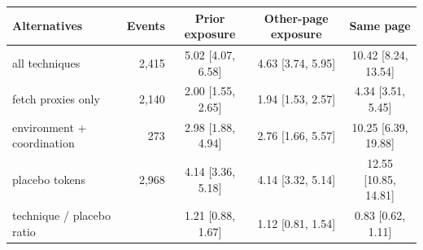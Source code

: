 \begin{tabular}{@{}lrccc@{}}
\toprule
Alternatives & Events & Prior exposure & Other-page exposure & Same page \\
\midrule
all techniques & 2,415 & 5.02 [4.07, 6.58] & 4.63 [3.74, 5.95] & 10.42 [8.24, 13.54] \\
fetch proxies only & 2,140 & 2.00 [1.55, 2.65] & 1.94 [1.53, 2.57] & 4.34 [3.51, 5.45] \\
environment + coordination & 273 & 2.98 [1.88, 4.94] & 2.76 [1.66, 5.57] & 10.25 [6.39, 19.88] \\
placebo tokens & 2,968 & 4.14 [3.36, 5.18] & 4.14 [3.32, 5.14] & 12.55 [10.85, 14.81] \\
\midrule
technique / placebo ratio & & 1.21 [0.88, 1.67] & 1.12 [0.81, 1.54] & 0.83 [0.62, 1.11] \\
\bottomrule
\end{tabular}
